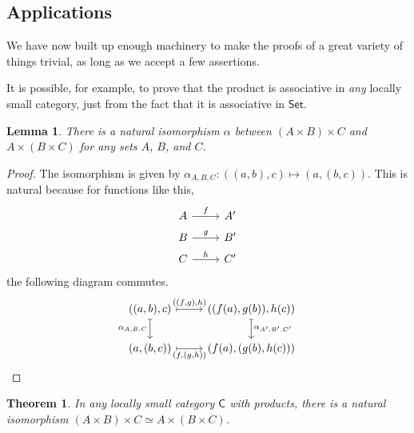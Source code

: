 \documentclass[a4paper,10pt]{scrreprt}
\theoremstyle{definition}
\theoremstyle{plain}
\newtheorem{theorem}{Theorem}[section]
\newtheorem{lemma}{Lemma}[section]
\theoremstyle{remark}
\begin{document}
\subsection{Applications}
We have now built up enough machinery to make the proofs of a great variety of things trivial, as long as we accept a few assertions. 

It is possible, for example, to prove that the product is associative in \emph{any} locally small category, just from the fact that it is associative in $\mathsf{Set}$.
\begin{lemma}
  There is a natural isomorphism $\alpha$ between $(A \times B) \times C$ and $A \times (B \times C)$ for any sets $A$, $B$, and $C$.
\end{lemma}
\begin{proof}
  The isomorphism is given by $\alpha_{A, B, C}\colon ((a, b), c) \mapsto (a, (b, c))$. This is natural because for functions like this,
  \begin{equation*}
    \begin{tikzcd}[row sep=tiny]
      A 
      \arrow[r, "f"]
      & A'
      \\
      B 
      \arrow[r, "g"]
      & B'
      \\
      C 
      \arrow[r, "h"]
      & C'
    \end{tikzcd}
  \end{equation*}
  the following diagram commutes.
  \begin{equation*}
    \begin{tikzcd}
      ((a, b), c)
      \arrow[r, mapsto, "{((f, g), h)}"]
      \arrow[d, mapsto, swap, "{\alpha_{A, B, C}}"]
      & ((f(a), g(b)), h(c))
      \arrow[d, mapsto, "{\alpha_{A', B', C'}}"]
      \\
      (a, (b, c))
      \arrow[r, mapsto, swap, "{(f, (g, h))}"]
      & (f(a), (g(b), h(c)))
    \end{tikzcd}
  \end{equation*}
\end{proof}
\begin{theorem}
  \label{thm:categoricalproductisassociative}
  In any locally small category $\mathsf{C}$ with products, there is a natural isomorphism $(A \times B) \times C \simeq A \times (B \times C)$.
\end{theorem}
\end{document}
